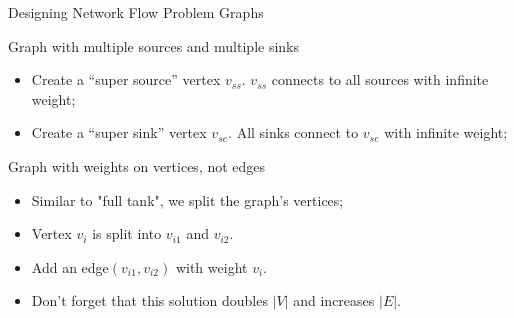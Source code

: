 \begin{frame}{Designing Network Flow Problem Graphs}
  \begin{block}{Graph with multiple sources and multiple sinks}
  \begin{itemize}
  \item Create a ``super source'' vertex $v_{ss}$. $v_{ss}$ connects to all sources with infinite weight;
  \item Create a ``super sink'' vertex $v_{se}$. All sinks connect to $v_{se}$ with infinite weight;
  \end{itemize}
  \end{block}


  \begin{block}{Graph with weights on vertices, not edges}
    \begin{itemize}
    \item Similar to "full tank", we split the graph's vertices;
    \item Vertex $v_i$ is split into $v_{i1}$ and $v_{i2}$.
    \item Add an edge$(v_{i1}, v_{i2})$ with weight $v_i$.
    \item Don't forget that this solution doubles $|V|$ and increases $|E|$.
    \end{itemize}
  \end{block}
\end{frame}

